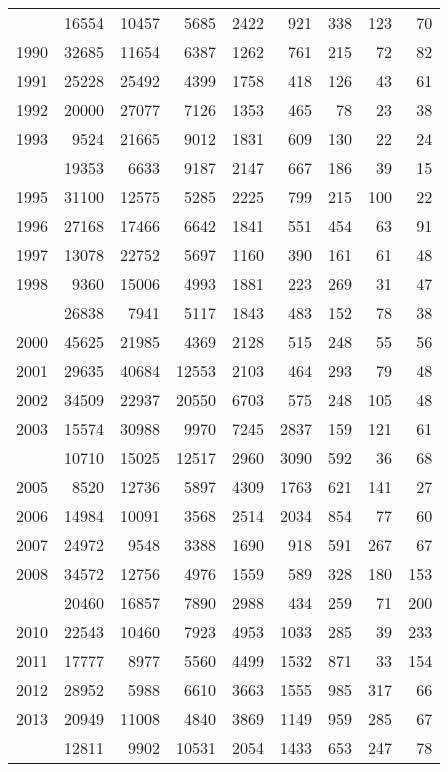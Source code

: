 \documentclass[
]{article}
\begin{document}
\begin{longtable}[t]{lrrrrrrrr}
\endfoot
\bottomrule
\endlastfoot
1989 & 16554 & 10457 & 5685 & 2422 & 921 & 338 & 123 & 70\\
1990 & 32685 & 11654 & 6387 & 1262 & 761 & 215 & 72 & 82\\
1991 & 25228 & 25492 & 4399 & 1758 & 418 & 126 & 43 & 61\\
1992 & 20000 & 27077 & 7126 & 1353 & 465 & 78 & 23 & 38\\
1993 & 9524 & 21665 & 9012 & 1831 & 609 & 130 & 22 & 24\\
\addlinespace
1994 & 19353 & 6633 & 9187 & 2147 & 667 & 186 & 39 & 15\\
1995 & 31100 & 12575 & 5285 & 2225 & 799 & 215 & 100 & 22\\
1996 & 27168 & 17466 & 6642 & 1841 & 551 & 454 & 63 & 91\\
1997 & 13078 & 22752 & 5697 & 1160 & 390 & 161 & 61 & 48\\
1998 & 9360 & 15006 & 4993 & 1881 & 223 & 269 & 31 & 47\\
\addlinespace
1999 & 26838 & 7941 & 5117 & 1843 & 483 & 152 & 78 & 38\\
2000 & 45625 & 21985 & 4369 & 2128 & 515 & 248 & 55 & 56\\
2001 & 29635 & 40684 & 12553 & 2103 & 464 & 293 & 79 & 48\\
2002 & 34509 & 22937 & 20550 & 6703 & 575 & 248 & 105 & 48\\
2003 & 15574 & 30988 & 9970 & 7245 & 2837 & 159 & 121 & 61\\
\addlinespace
2004 & 10710 & 15025 & 12517 & 2960 & 3090 & 592 & 36 & 68\\
2005 & 8520 & 12736 & 5897 & 4309 & 1763 & 621 & 141 & 27\\
2006 & 14984 & 10091 & 3568 & 2514 & 2034 & 854 & 77 & 60\\
2007 & 24972 & 9548 & 3388 & 1690 & 918 & 591 & 267 & 67\\
2008 & 34572 & 12756 & 4976 & 1559 & 589 & 328 & 180 & 153\\
\addlinespace
2009 & 20460 & 16857 & 7890 & 2988 & 434 & 259 & 71 & 200\\
2010 & 22543 & 10460 & 7923 & 4953 & 1033 & 285 & 39 & 233\\
2011 & 17777 & 8977 & 5560 & 4499 & 1532 & 871 & 33 & 154\\
2012 & 28952 & 5988 & 6610 & 3663 & 1555 & 985 & 317 & 66\\
2013 & 20949 & 11008 & 4840 & 3869 & 1149 & 959 & 285 & 67\\
\addlinespace
2014 & 12811 & 9902 & 10531 & 2054 & 1433 & 653 & 247 & 78\\

\end{longtable}
\end{document}
